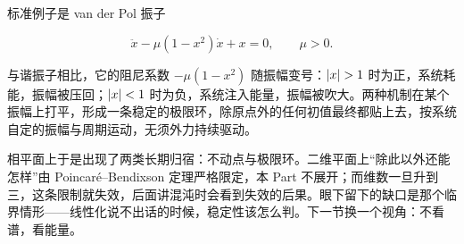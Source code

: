 标准例子是 van der Pol 振子

\[
\ddot x-\mu(1-x^2)\dot x+x=0,
\qquad \mu>0.
\]

与谐振子相比，它的阻尼系数 \(-\mu(1-x^2)\) 随振幅变号：\(\abs{x}>1\) 时为正，系统耗能，振幅被压回；\(\left|x\right|<1\) 时为负，系统注入能量，振幅被吹大。两种机制在某个振幅上打平，形成一条稳定的极限环，除原点外的任何初值最终都贴上去，按系统自定的振幅与周期运动，无须外力持续驱动。

相平面上于是出现了两类长期归宿：不动点与极限环。二维平面上``除此以外还能怎样''由 Poincar\'e--Bendixson 定理严格限定，本 Part 不展开；而维数一旦升到三，这条限制就失效，后面讲混沌时会看到失效的后果。眼下留下的缺口是那个临界情形——线性化说不出话的时候，稳定性该怎么判。下一节换一个视角：不看谱，看能量。
